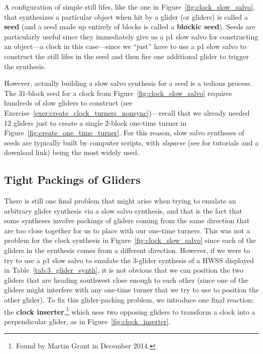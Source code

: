 A configuration of simple still lifes, like the one in Figure~\ref{fig:clock_slow_salvo}, that synthesizes a particular object when hit by a glider (or gliders) is called a \textbf{seed} (and a seed made up entirely of blocks is called a \textbf{blockic seed}). Seeds are particularly useful since they immediately give us a p1 slow salvo for constructing an object---a clock in this case---since we ``just'' have to use a p1 slow salvo to construct the still lifes in the seed and then fire one additional glider to trigger the synthesis.

However, actually building a slow salvo synthesis for a seed is a tedious process. The $31$-block seed for a clock from Figure~\ref{fig:clock_slow_salvo} requires hundreds of slow gliders to construct (see Exercise~\ref{exer:create_clock_turners_nonsync})---recall that we already needed 12 gliders just to create a single $2$-block one-time turner in Figure~\ref{fig:create_one_time_turner}. For this reason, slow salvo syntheses of seeds are typically built by computer scripts, with \emph{slsparse} (see  for tutorials and a download link) being the most widely used.%


\subsection{Tight Packings of Gliders}\label{sec:slow_salvo_tight}

There is still one final problem that might arise when trying to emulate an arbitrary glider synthesis via a slow salvo synthesis, and that is the fact that some syntheses involve packings of gliders coming from the same direction that are too close together for us to place with our one-time turners. This was not a problem for the clock synthesis in Figure~\ref{fig:clock_slow_salvo} since each of the gliders in the synthesis comes from a different direction. However, if we were to try to use a p1 slow salvo to emulate the 3-glider synthesis of a HWSS displayed in Table~\ref{tab:3_glider_synth}, it is not obvious that we can position the two gliders that are heading southwest close enough to each other (since one of the gliders might interfere with any one-time turner that we try to use to position the other glider). To fix this glider-packing problem, we introduce one final reaction: the \textbf{clock inserter},\footnote{Found by Martin Grant in December 2014.} which uses two opposing gliders to transform a clock into a perpendicular glider, as in Figure~\ref{fig:clock_inserter}.

